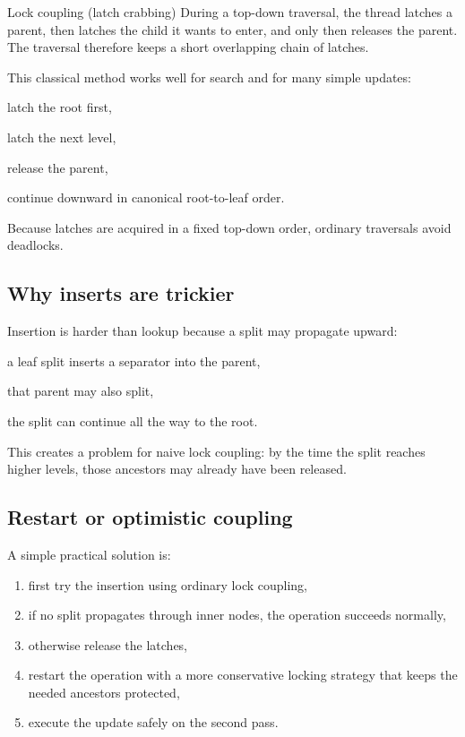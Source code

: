 \documentclass[../../dis.tex]{subfiles}
\begin{document}
\begin{concept}{Lock coupling (latch crabbing)}
During a top-down traversal, the thread latches a parent, then latches the child it wants to enter, and only then releases the parent. The traversal therefore keeps a short overlapping chain of latches.
\end{concept}

This classical method works well for search and for many simple updates:
\begin{dashlist}
    \item latch the root first,
    \item latch the next level,
    \item release the parent,
    \item continue downward in canonical root-to-leaf order.
\end{dashlist}

Because latches are acquired in a fixed top-down order, ordinary traversals avoid deadlocks.

\subsection{Why inserts are trickier}
Insertion is harder than lookup because a split may propagate upward:
\begin{dashlist}
    \item a leaf split inserts a separator into the parent,
    \item that parent may also split,
    \item the split can continue all the way to the root.
\end{dashlist}

This creates a problem for naive lock coupling: by the time the split reaches higher levels, those ancestors may already have been released.

\subsection{Restart or optimistic coupling}
A simple practical solution is:
\begin{enumerate}
    \item first try the insertion using ordinary lock coupling,
    \item if no split propagates through inner nodes, the operation succeeds normally,
    \item otherwise release the latches,
    \item restart the operation with a more conservative locking strategy that keeps the needed ancestors protected,
    \item execute the update safely on the second pass.
\end{enumerate}
\end{document}
